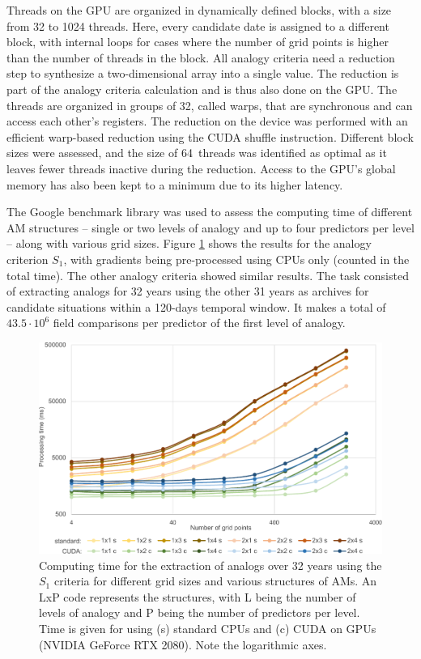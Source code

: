 \documentclass[draft]{agujournal2019}
\begin{document}
Threads on the GPU are organized in dynamically defined blocks, with a size from 32 to 1024 threads. Here, every candidate date is assigned to a different block, with internal loops for cases where the number of grid points is higher than the number of threads in the block. All analogy criteria need a reduction step to synthesize a two-dimensional array into a single value. The reduction is part of the analogy criteria calculation and is thus also done on the GPU. The threads are organized in groups of 32, called warps, that are synchronous and can access each other's registers. The reduction on the device was performed with an efficient warp-based reduction using the CUDA shuffle instruction. Different block sizes were assessed, and the size of 64~threads was identified as optimal as it leaves fewer threads inactive during the reduction. Access to the GPU's global memory has also been kept to a minimum due to its higher latency.

The Google benchmark library was used to assess the computing time of different AM structures -- single or two levels of analogy and up to four predictors per level -- along with various grid sizes. Figure \ref{cuda} shows the results for the analogy criterion $S_{1}$, with gradients being pre-processed using CPUs only (counted in the total time). The other analogy criteria showed similar results. The task consisted of extracting analogs for 32 years using the other 31 years as archives for candidate situations within a 120-days temporal window. It makes a total of $43.5\cdot10^6$ field comparisons per predictor of the first level of analogy.

\begin{figure}[hbt]
	\noindent\includegraphics[width=130mm]{figures/cuda-timing.pdf}
	\caption{Computing time for the extraction of analogs over 32 years using the $S_{1}$ criteria for different grid sizes and various structures of AMs. An LxP code represents the structures, with L being the number of levels of analogy and P being the number of predictors per level. Time is given for using (s) standard CPUs and (c) CUDA on GPUs (NVIDIA GeForce RTX 2080). Note the logarithmic axes.}
	\label{cuda}
\end{figure}
\end{document}
